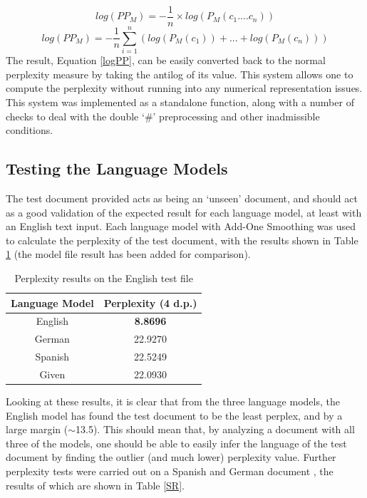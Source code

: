 \documentclass[12pt]{article}
\begin{document}
\[log\left(PP_{M}\right) = -\frac{1}{n}\times log\left(P_{M}\left( c_{1}.... c_{n}\right)\right)\]
\begin{equation}\label{logPP}
log\left(PP_{M}\right) = -\frac{1}{n} \sum_{i=1} ^{n}\left( log(P_{M}(c_{1})) + ... + log(P_{M}(c_{n})) \right)
\end{equation}
The result, Equation \ref{logPP}, can be easily converted back to the normal perplexity measure by taking the antilog of its value.  This system allows one to compute the perplexity without running into any numerical representation issues.  This system was implemented as a standalone function, along with a number of checks to deal with the double `\#' preprocessing and other inadmissible conditions.  
\subsection{Testing the Language Models}
The test document provided acts as being an `unseen' document, and should act as a good validation of the expected result for each language model, at least with an English text input.  Each language model with Add-One Smoothing was used to calculate the perplexity of the test document, with the results shown in Table \ref{TR} (the model file result has been added for comparison).
	\begin{table}[H]
	\centering
	\setlength\arrayrulewidth{1pt}
	\caption{\label{TR}Perplexity results on the English test file }
	\begin{tabular}{c  c }
		\hline
		\textbf{Language Model} & \textbf{Perplexity (4 d.p.)} \\
		\hline                     
	English& \textbf{8.8696}\\
	German & 22.9270 \\
	Spanish & 22.5249 \\
	Given & 22.0930\\
	\end{tabular}
\end{table}
Looking at these results, it is clear that from the three language models, the English model has found the test document to be the least perplex, and by a large margin ($\sim$13.5).  This should mean that, by analyzing a document with all three of the models, one should be able to easily infer the language of the test document by finding the outlier (and much lower) perplexity value.  Further perplexity tests were carried out on a Spanish \cite{GSpan} and German document \cite{GSpan}, the results of which are shown in Table \ref{SR}.
\end{document}
